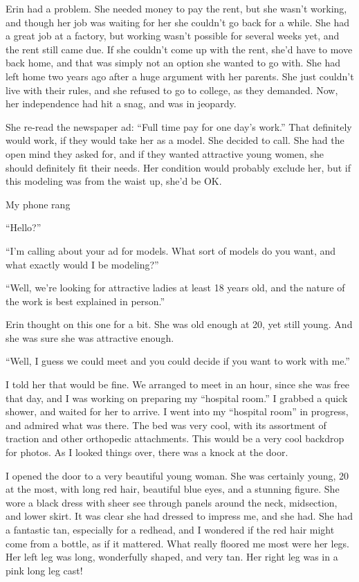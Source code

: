 Erin had a problem. She needed money to pay the rent, but she wasn't working, and though her
job was waiting for her she couldn't go back for a while. She had a great job at a factory, but
working wasn't possible for several weeks yet, and the rent still came due. If she couldn't come
up with the rent, she'd have to move back home, and that was simply not an option she wanted to
go with. She had left home two years ago after a huge argument with her parents. She just
couldn't live with their rules, and she refused to go to college, as they demanded. Now, her
independence had hit a snag, and was in jeopardy.

She re-read the newspaper ad: ``Full time pay for one day's work.'' That definitely would
work, if they would take her as a model. She decided to call. She had the open mind they asked
for, and if they wanted attractive young women, she should definitely fit their needs. Her
condition would probably exclude her, but if this modeling was from the waist up, she'd be OK.

My phone rang

``Hello?''

``I'm calling about your ad for models. What sort of models do you want, and what exactly
would I be modeling?''

``Well, we're looking for attractive ladies at least 18 years old, and the nature of the
work is best explained in person.''

Erin thought on this one for a bit. She was old enough at 20, yet still young. And she was
sure she was attractive enough.

``Well, I guess we could meet and you could decide if you want to work with me.''

I told her that would be fine. We arranged to meet in an hour, since she was free that day,
and I was working on preparing my ``hospital room.'' I grabbed a quick shower, and waited for
her to arrive. I went into my ``hospital room'' in progress, and admired what was there. The bed
was very cool, with its assortment of traction and other orthopedic attachments. This would be a
very cool backdrop for photos. As I looked things over, there was a knock at the door.

I opened the door to a very beautiful young woman. She was certainly young, 20 at the most,
with long red hair, beautiful blue eyes, and a stunning figure. She wore a black dress with
sheer see through panels around the neck, midsection, and lower skirt. It was clear she had
dressed to impress me, and she had. She had a fantastic tan, especially for a redhead, and I
wondered if the red hair might come from a bottle, as if it mattered. What really floored me
most were her legs. Her left leg was long, wonderfully shaped, and very tan. Her right leg was
in a pink long leg cast!

